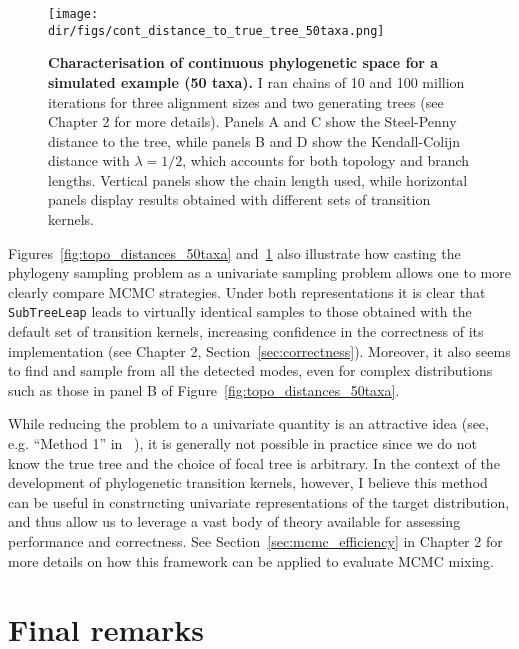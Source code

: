 \begin{figure}[!ht]
\begin{center}
\texttt{[image: \\dir/figs/cont\_distance\_to\_true\_tree\_50taxa.png]} 
\end{center}
 \caption[Characterisation of continuous phylogenetic space for a simulated example (50 taxa).]{\textbf{Characterisation of continuous phylogenetic space for a simulated example (50 taxa).}
  I ran chains of 10 and 100 million iterations for three alignment sizes and two generating trees (see Chapter 2 for more details).
 Panels A and C show the Steel-Penny~\citep{Steel1993} distance to the tree, while panels B and D show the Kendall-Colijn~\citep{Kendall2016} distance with $\lambda = 1/2$,  which accounts for both topology and branch lengths. 
 Vertical panels show the chain length used, while horizontal panels display results obtained with different sets of transition kernels.
 }
 \label{fig:cont_distances_50taxa}
\end{figure}
Figures~\ref{fig:topo_distances_50taxa} and~\ref{fig:cont_distances_50taxa} also illustrate how casting the phylogeny sampling problem as a univariate sampling problem allows one to more clearly compare MCMC strategies.
Under both representations it is clear that \verb|SubTreeLeap| leads to virtually identical samples to those obtained with the default set of transition kernels, increasing confidence in the correctness of its implementation (see Chapter 2, Section~\ref{sec:correctness}). 
Moreover, it also seems to find and sample from all the detected modes, even for complex distributions such as those in panel B of Figure~\ref{fig:topo_distances_50taxa}.

While reducing the problem to a univariate quantity is an attractive idea (see, e.g. ``Method 1'' in ~\cite{Lanfear2016}), it is generally not possible in practice since we do not know the true tree and the choice of focal tree is arbitrary.
In the context of the development of phylogenetic transition kernels, however, I believe this method can be useful in constructing univariate representations of the target distribution, and thus allow us to leverage a vast body of theory available for assessing performance and correctness.
See Section~\ref{sec:mcmc_efficiency} in Chapter 2 for more details on how this  framework can be applied to evaluate MCMC mixing.

\section{Final remarks}
\label{sec:conclusion}

